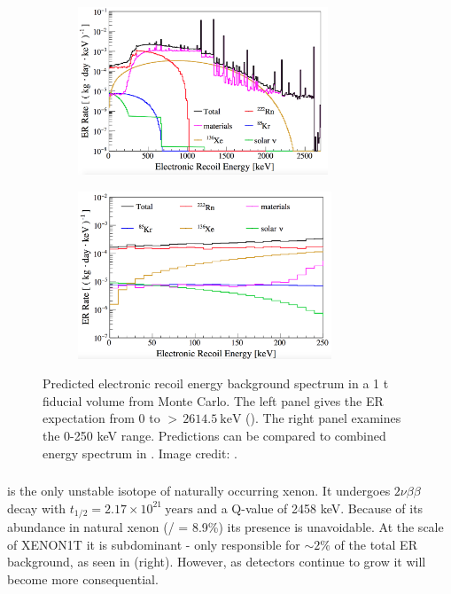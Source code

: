 \begin{figure}
    \centering
    \begin{subfigure}[t]{0.5\textwidth}
        \centering
        \includegraphics[height=5cm]{ERRateMCFull}
    \end{subfigure}%
    \begin{subfigure}[t]{0.5\textwidth}
        \centering
        \includegraphics[height=5cm]{ERRateMCZoomed}
    \end{subfigure}
    \caption[Predicted electronic recoil energy background spectrum in a 1 t fiducial volume from Monte Carlo.]{Predicted electronic recoil
    energy background spectrum in a 1 t fiducial volume from Monte Carlo.  The left panel gives the
    ER expectation from 0 to ${>}\, 2614.5\ \mathrm{keV}$ ().  The right panel examines the 0-250 keV range.  Predictions can
    be compared to combined energy spectrum in .  Image credit:
    .}
	\label{fig:backgrounds_er_spectrum}
\end{figure}



\subsubsection{}
\label{subsubsec:backgrounds_electronic_xe}
 is the only unstable isotope of naturally occurring xenon.  It undergoes $2 \nu \beta \beta$ decay with
$t_{1/2} = 2.17 \times 10^{21}\ \mathrm{years}$  and a Q-value of 2458 keV.  Because of its abundance in natural
xenon (/ = 8.9\%) its presence is unavoidable.  At the scale of XENON1T it is subdominant - only responsible for
${\sim}2 \%$ of the total ER background, as seen in  (right).  However, as detectors continue to grow
it will become more consequential.



